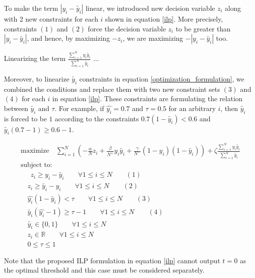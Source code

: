 \documentclass[a4paper]{article}
\begin{document}
To make the term $|y_i -\tilde{y_i}|$ linear, we introduced new decision variable $z_i$ along with 2 new constraints for each $i$ shown in equation \ref{ilp}. More precisely, constraints $(1)$ and $(2)$ force the decision variable $z_i$ to be greater than $|y_i - \tilde{y_i}|$, and hence, by maximizing $-z_i$, we are maximizing $-|y_i - \tilde{y_i}|$ too.

Linearizing the term $\frac{\sum_{i=1}^{N} y_i \tilde{y_i}}{\sum_{i=1}^{N} \tilde{y_i}}$ ...

 Moreover, to linearize $\tilde{y_i}$ constraints in equation \ref{optimization_formulation}, we combined the conditions and replace them with two new constraint sets $(3)$ and $(4)$ for each $i$ in equation \ref{ilp}. These constraints are formulating the relation between $\tilde{y_i}$ and $\tau$. For example, if $\hat{y_i} = 0.7$ and $\tau=0.5$ for an arbitrary $i$, then $\tilde{y_i}$ is forced to be $1$ according to the constraints $0.7 (1 - \tilde{y_i}) < 0.6$ and $\tilde{y_i} (0.7 - 1) \ge 0.6 - 1$.

\begin{equation}
\label{ilp}
\begin{aligned}
&\text{maximize} \quad \sum_{i=1}^{N} \left(-\frac{\alpha}{N}z_i + \frac{\beta}{N^+} y_i \tilde{y_i} + \frac{\gamma}{N^-} (1-y_i) (1-\tilde{y_i})\right) + \zeta \frac{\sum_{i=1}^{N} y_i \tilde{y_i}}{\sum_{i=1}^{N} \tilde{y_i}}\\
&\text{subject to:}\\
&\quad \: \: z_i \ge y_i - \tilde{y_i} \qquad \forall 1\le i \le N \qquad (1)\\
& \quad z_i \ge \tilde{y_i}  - y_i \qquad \forall 1\le i \le N \qquad (2)\\
& \quad \hat{y_i} (1 - \tilde{y_i}) < \tau \qquad \forall 1\le i \le N \qquad (3)\\
& \quad  \tilde{y_i} (\hat{y_i} - 1) \ge \tau - 1 \qquad \forall 1\le i \le N \qquad (4)\\
& \quad \tilde{y_i} \in \{0, 1\} \qquad \forall 1\le i \le N \\
& \quad z_i \in \mathbb{R} \qquad \forall 1\le i \le N \\
& \quad  0 \le \tau \le 1
\end{aligned}
\end{equation}

Note that the proposed ILP formulation in equation \ref{ilp} cannot output $t=0$ as the optimal threshold and this case must be considered separately. 
\end{document}
